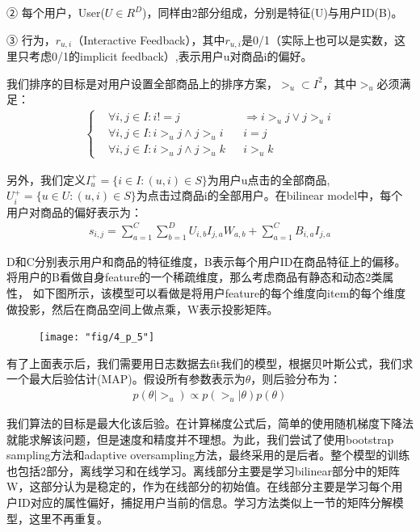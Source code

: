   ② 每个用户，User($U \in R^D$)，同样由2部分组成，分别是特征(U)与用户ID(B)。
  
  ③ 行为，$r_{u,i}$（Interactive Feedback），其中$r_{u,i}$是0/1（实际上也可以是实数，这里只考虑0/1的implicit feedback）,表示用户u对商品i的偏好。

  我们排序的目标是对用户设置全部商品上的排序方案，$>_u \subset I^2$，其中$>_u $必须满足：
  \begin{equation}
\begin{split}
    \left\{
	\begin{aligned}
	& \forall i,j \in I: i != j && \Rightarrow i >_u j \vee j>_u i \\
	&  \forall i,j \in I:i >_u j \land j>_u i && i = j\\
	& \forall i,j \in I:i >_u j \land j>_u k && i >_u k 
	\end{aligned}
	\right.
\end{split}
\end{equation}

另外，我们定义$I_u^+ = \{i \in I:(u,i) \in S\}$为用户u点击的全部商品,$U_i^+ = \{u \in U:(u,i) \in S\}$为点击过商品i的全部用户。在bilinear model中，每个用户对商品的偏好表示为：
     \begin{equation}\label{uv3}
	\begin{split}
		s_{i,j} = \sum_{a=1}^C \sum_{b=1}^D U_{i,b}I_{j,a}W_{a,b} + \sum_{a=1}^C B_{i,a}I_{j,a}
    	\end{split}
\end{equation}

D和C分别表示用户和商品的特征维度，B表示每个用户ID在商品特征上的偏移。将用户的B看做自身feature的一个稀疏维度，那么考虑商品有静态和动态2类属性， 如下图所示，该模型可以看做是将用户feature的每个维度向item的每个维度做投影，然后在商品空间上做点乘，W表示投影矩阵。

  \begin{figure}[h]
	\centering
	\texttt{[image: "fig/4\_p\_5"]}
\end{figure}

有了上面表示后，我们需要用日志数据去fit我们的模型，根据贝叶斯公式，我们求一个最大后验估计(MAP)。假设所有参数表示为$\theta$，则后验分布为：
     \begin{equation}\label{uv3}
	\begin{split}
		p(\theta|>_u) \propto p(>_u|\theta)p(\theta)
    	\end{split}
\end{equation}

我们算法的目标是最大化该后验。在计算梯度公式后，简单的使用随机梯度下降法就能求解该问题，但是速度和精度并不理想。为此，我们尝试了使用bootstrap sampling方法和adaptive oversampling方法，最终采用的是后者。整个模型的训练也包括2部分，离线学习和在线学习。离线部分主要是学习bilinear部分中的矩阵W，这部分认为是稳定的，作为在线部分的初始值。在线部分主要是学习每个用户ID对应的属性偏好，捕捉用户当前的信息。学习方法类似上一节的矩阵分解模型，这里不再重复。

